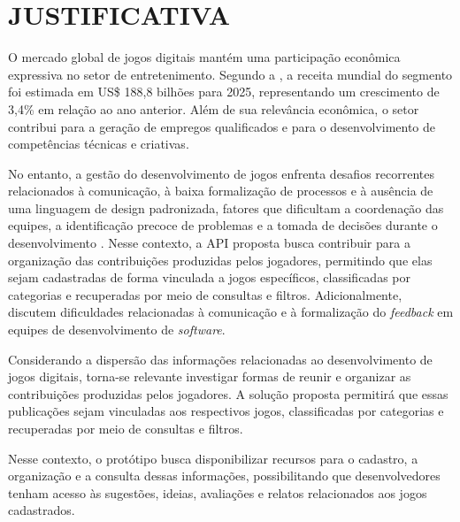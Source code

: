 \chapter{JUSTIFICATIVA}
\label{cap:justificativa}

O mercado global de jogos digitais mantém uma participação econômica expressiva no setor de entretenimento. Segundo a , a receita mundial do segmento foi estimada em US\$ 188,8 bilhões para 2025, representando um crescimento de 3,4\% em relação ao ano anterior. Além de sua relevância econômica, o setor contribui para a geração de empregos qualificados e para o desenvolvimento de competências técnicas e criativas.

No entanto, a gestão do desenvolvimento de jogos enfrenta desafios recorrentes relacionados à comunicação, à baixa formalização de processos e à ausência de uma linguagem de design padronizada, fatores que dificultam a coordenação das equipes, a identificação precoce de problemas e a tomada de decisões durante o desenvolvimento \cite{giri2022exploratory}. Nesse contexto, a API proposta busca contribuir para a organização das contribuições produzidas pelos jogadores, permitindo que elas sejam cadastradas de forma vinculada a jogos específicos, classificadas por categorias e recuperadas por meio de consultas e filtros. Adicionalmente,  discutem dificuldades relacionadas à comunicação e à formalização do \textit{feedback} em equipes de desenvolvimento de \textit{software}. 

Considerando a dispersão das informações relacionadas ao desenvolvimento de jogos digitais, torna-se relevante investigar formas de reunir e organizar as contribuições produzidas pelos jogadores. A solução proposta permitirá que essas publicações sejam vinculadas aos respectivos jogos, classificadas por categorias e recuperadas por meio de consultas e filtros.

Nesse contexto, o protótipo busca disponibilizar recursos para o cadastro, a organização e a consulta dessas informações, possibilitando que desenvolvedores tenham acesso às sugestões, ideias, avaliações e relatos relacionados aos jogos cadastrados.